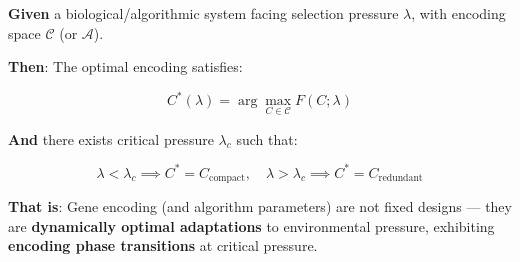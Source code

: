 \documentclass[12pt,a4paper]{article}
\newcommand{\calC}{\mathcal{C}}
\newcommand{\calA}{\mathcal{A}}
\newcommand{\calCcompact}{C_{\text{compact}}}
\newcommand{\calCredund}{C_{\text{redundant}}}
\newcommand{\calCstar}{C^*}
\newcommand{\lamc}{\lambda_c}
\begin{document}
\begin{tcolorbox}[colback=blue!5!white,colframe=blue!75!black,title=D14 Encoding Duality Theorem]
\textbf{Given} a biological/algorithmic system facing selection pressure $\lambda$, with encoding space $\calC$ (or $\calA$).

\textbf{Then}: The optimal encoding satisfies:

$$\boxed{\calCstar(\lambda) = \arg\max_{C \in \calC} F(C; \lambda)}$$

\textbf{And} there exists critical pressure $\lamc$ such that:

$$\lambda < \lamc \implies \calCstar = \calCcompact, \quad \lambda > \lamc \implies \calCstar = \calCredund$$

\textbf{That is}: Gene encoding (and algorithm parameters) are not fixed designs --- they are \textbf{dynamically optimal adaptations} to environmental pressure, exhibiting \textbf{encoding phase transitions} at critical pressure.
\end{tcolorbox}
\end{document}
